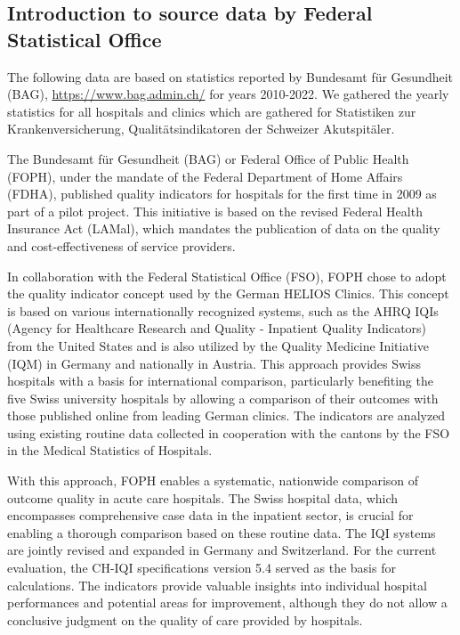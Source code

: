 \subsection{Introduction to source data by Federal Statistical Office}
The following data are based on statistics reported by Bundesamt für Gesundheit (BAG), \url{https://www.bag.admin.ch/} for years 2010-2022. 
We gathered the yearly statistics for all hospitals and clinics which are gathered for
Statistiken zur Krankenversicherung, Qualitätsindikatoren der Schweizer Akutspitäler.

The Bundesamt für Gesundheit (BAG) or Federal Office of Public Health (FOPH), under the mandate of the Federal Department of Home Affairs (FDHA), published quality indicators for hospitals for the first time in 2009 as part of a pilot project. This initiative is based on the revised Federal Health Insurance Act (LAMal), which mandates the publication of data on the quality and cost-effectiveness of service providers.

In collaboration with the Federal Statistical Office (FSO), FOPH chose to adopt the quality indicator concept used by the German HELIOS Clinics. This concept is based on various internationally recognized systems, such as the AHRQ IQIs (Agency for Healthcare Research and Quality - Inpatient Quality Indicators) from the United States and is also utilized by the Quality Medicine Initiative (IQM) in Germany and nationally in Austria. This approach provides Swiss hospitals with a basis for international comparison, particularly benefiting the five Swiss university hospitals by allowing a comparison of their outcomes with those published online from leading German clinics. The indicators are analyzed using existing routine data collected in cooperation with the cantons by the FSO in the Medical Statistics of Hospitals.

With this approach, FOPH enables a systematic, nationwide comparison of outcome quality in acute care hospitals. The Swiss hospital data, which encompasses comprehensive case data in the inpatient sector, is crucial for enabling a thorough comparison based on these routine data. The IQI systems are jointly revised and expanded in Germany and Switzerland. For the current evaluation, the CH-IQI specifications version 5.4 served as the basis for calculations. The indicators provide valuable insights into individual hospital performances and potential areas for improvement, although they do not allow a conclusive judgment on the quality of care provided by hospitals.

